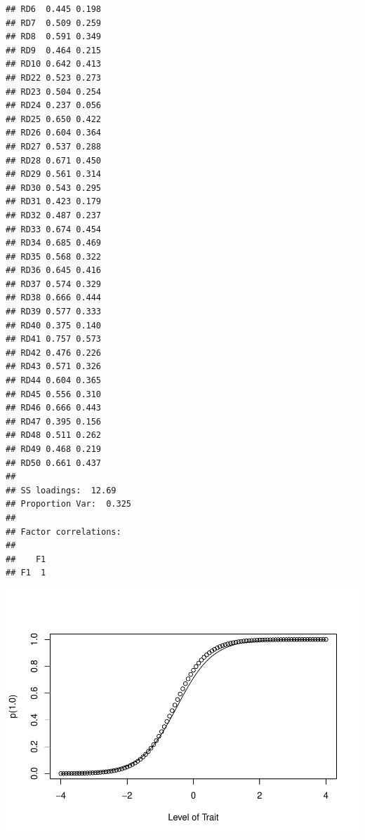 \documentclass[
  jou]{apa6}
\begin{document}
\begin{verbatim}
## RD6  0.445 0.198
## RD7  0.509 0.259
## RD8  0.591 0.349
## RD9  0.464 0.215
## RD10 0.642 0.413
## RD22 0.523 0.273
## RD23 0.504 0.254
## RD24 0.237 0.056
## RD25 0.650 0.422
## RD26 0.604 0.364
## RD27 0.537 0.288
## RD28 0.671 0.450
## RD29 0.561 0.314
## RD30 0.543 0.295
## RD31 0.423 0.179
## RD32 0.487 0.237
## RD33 0.674 0.454
## RD34 0.685 0.469
## RD35 0.568 0.322
## RD36 0.645 0.416
## RD37 0.574 0.329
## RD38 0.666 0.444
## RD39 0.577 0.333
## RD40 0.375 0.140
## RD41 0.757 0.573
## RD42 0.476 0.226
## RD43 0.571 0.326
## RD44 0.604 0.365
## RD45 0.556 0.310
## RD46 0.666 0.443
## RD47 0.395 0.156
## RD48 0.511 0.262
## RD49 0.468 0.219
## RD50 0.661 0.437
## 
## SS loadings:  12.69 
## Proportion Var:  0.325 
## 
## Factor correlations: 
## 
##    F1
## F1  1
\end{verbatim}

\includegraphics{ICC_project_files/figure-latex/generalrecodes-1.pdf}
\end{document}
